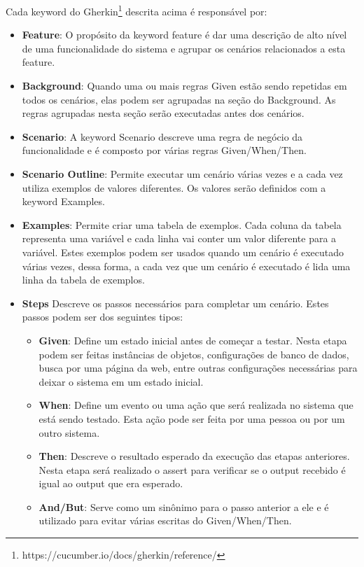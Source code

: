 Cada keyword do Gherkin\footnote{https://cucumber.io/docs/gherkin/reference/} descrita acima é responsável por:
\begin{itemize}
    \item \textbf{Feature}:
    O propósito da keyword feature é dar uma descrição de alto nível de uma funcionalidade do sistema e agrupar os cenários relacionados a esta feature.
    \item \textbf{Background}:
    Quando uma ou mais regras Given estão sendo repetidas em todos os cenários, elas podem ser agrupadas na seção do Background. As regras agrupadas nesta seção serão executadas antes dos cenários.
    \item \textbf{Scenario}:
    A keyword Scenario descreve uma regra de negócio da funcionalidade e é composto por várias regras Given/When/Then.
    \item \textbf{Scenario Outline}:
    Permite executar um cenário várias vezes e a cada vez utiliza exemplos de valores diferentes. Os valores serão definidos com a keyword Examples.
    \item \textbf{Examples}:
    Permite criar uma tabela de exemplos. Cada coluna da tabela representa uma variável e cada linha vai conter um valor diferente para a variável. Estes exemplos podem ser usados quando um cenário é executado várias vezes, dessa forma, a cada vez que um cenário é executado é lida uma linha da tabela de exemplos.
    \item \textbf{Steps}
    Descreve os passos necessários para completar um cenário. Estes passos podem ser dos seguintes tipos:
    \begin{itemize}
        \item \textbf{Given}:
        Define um estado inicial antes de começar a testar. Nesta etapa podem ser feitas instâncias de objetos, configurações de banco de dados, busca por uma página da web, entre outras configurações necessárias para deixar o sistema em um estado inicial.
        \item \textbf{When}:
        Define um evento ou uma ação que será realizada no sistema que está sendo testado. Esta ação pode ser feita por uma pessoa ou por um outro sistema. 
        \item \textbf{Then}:
        Descreve o resultado esperado da execução das etapas anteriores. Nesta etapa será realizado o assert para verificar se o output recebido é igual ao output que era esperado.
        \item \textbf{And/But}:
        Serve como um sinônimo para o passo anterior a ele e é utilizado para evitar várias escritas do Given/When/Then.
    \end{itemize}
    
    
\end{itemize}

